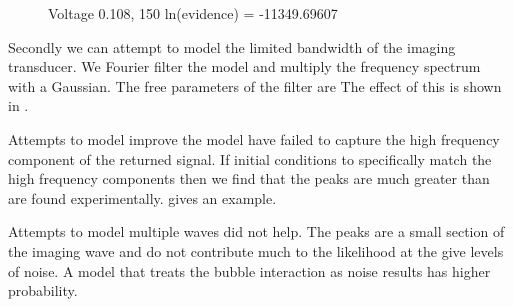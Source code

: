 \begin{figure}[t]%
  \centering
  \subfloat[]{
    \label{fig:plot_bubble_fit_108_150_filter_a:first}
    }
\caption{Voltage 0.108, 150 ln(evidence) = -11349.69607 }
\end{figure}

Secondly we can attempt to  model the limited bandwidth of the imaging transducer.
We Fourier filter the model and multiply the frequency spectrum with a Gaussian.
The free parameters of the filter are
The effect of this is shown in \figref{}.

%
Attempts to model improve the model have failed to capture the high frequency component of the returned signal.
If initial conditions to specifically match the high frequency components then
we find that the peaks are much greater than are found experimentally.
\Figref{} gives an example.

Attempts to model multiple waves did not help.
The peaks are a small section of the imaging wave 
and do not contribute much to the likelihood at the give levels of noise.
A model that treats the bubble interaction as noise results has higher probability.






